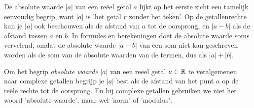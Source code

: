 \documentclass{ximera}
\begin{document}
	\author{Wim Obbels}
	\label{xim:complexe_getallen_norm}


\begin{xmuitweiding}
De absolute waarde $|a|$ van een reëel getal $a$ lijkt op het eerste zicht een tamelijk eenvoudig begrip, want $|a|$ is 'het getal $r$ zonder het teken'.
Op de getallenrechte kan je $|a|$ ook beschouwen als de afstand van $a$ tot de oorsprong, en $|a-b|$ als de afstand tussen $a$ en $b$.
In formules en berekeningen doet de absolute waarde soms vervelend, omdat de absolute waarde $|a+b|$ van een som niet kan geschreven worden als de som van de absolute waarden van de termen, dus als $|a|+|b|$.
\end{xmuitweiding}


Om het begrip \textit{absolute waarde} $|a|$ van een reëel getal $a\in\mathbb{R}$ te veralgemenen naar complexe getallen begrijp je $|a|$ best als de afstand van het punt $a$ op de reële rechte tot de oorsprong. En bij complexe getallen gebruiken we niet het woord 'absolute waarde', maar wel 'norm' of 'modulus': 
\end{document}

